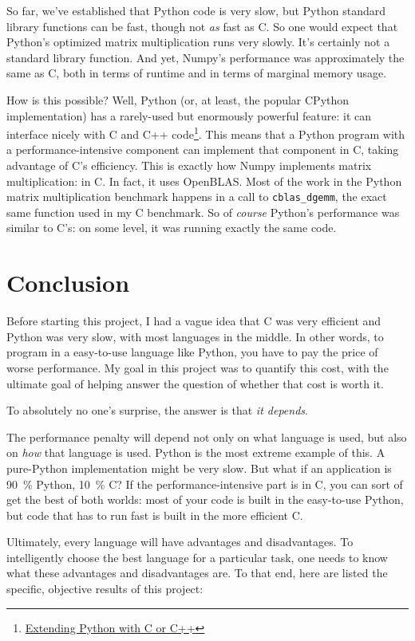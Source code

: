 \documentclass[12pt,letterpaper]{article}
\begin{document}
So far, we've established that Python code is very slow, but Python standard
library functions can be fast, though not \emph{as} fast as C. So one would
expect that Python's optimized matrix multiplication runs very slowly. It's
certainly not a standard library function. And yet, Numpy's performance was
approximately the same as C, both in terms of runtime and in terms of marginal
memory usage.

How is this possible? Well, Python (or, at least, the popular CPython
implementation) has a rarely-used but enormously powerful feature: it can
interface nicely with C and C++
code\footnote{\href{https://docs.python.org/3/extending/extending.html}{Extending
Python with C or C++}}. This means that a Python program with a
performance-intensive component can implement that component in C, taking
advantage of C's efficiency. This is exactly how Numpy implements matrix
multiplication: in C. In fact, it uses OpenBLAS. Most of the work in the Python
matrix multiplication benchmark happens in a call to \texttt{cblas\_dgemm}, the
exact same function used in my C benchmark. So of \emph{course} Python's
performance was similar to C's: on some level, it was running exactly the same
code.

\clearpage
\section{Conclusion}\label{conclusion}

Before starting this project, I had a vague idea that C was very efficient and
Python was very slow, with most languages in the middle. In other words, to
program in a easy-to-use language like Python, you have to pay the price of
worse performance. My goal in this project was to quantify this cost, with the
ultimate goal of helping answer the question of whether that cost is worth it.

To absolutely no one's surprise, the answer is that \emph{it depends}.

The performance penalty will depend not only on what language is used, but also
on \emph{how} that language is used. Python is the most extreme example of
this. A pure-Python implementation might be very slow. But what if an
application is \SI{90}{\%} Python, \SI{10}{\%} C? If the performance-intensive
part is in C, you can sort of get the best of both worlds: most of your code is
built in the easy-to-use Python, but code that has to run fast is built in the
more efficient C.

Ultimately, every language will have advantages and disadvantages. To
intelligently choose the best language for a particular task, one needs to know
what these advantages and disadvantages are. To that end, here are listed the
specific, objective results of this project:
\end{document}
